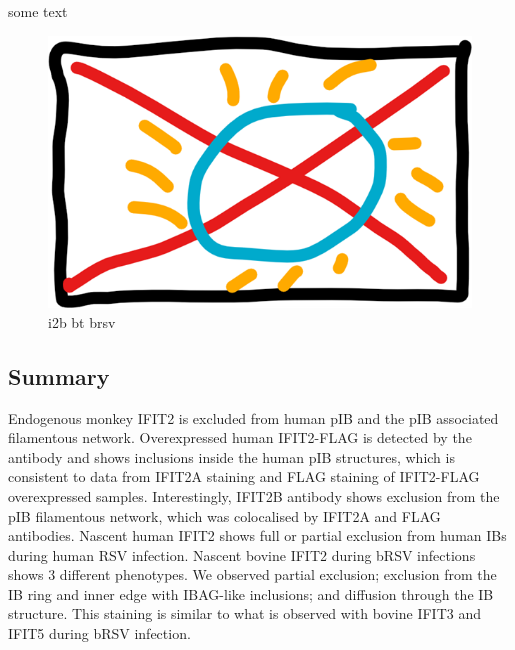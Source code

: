 some text

\begin{figure}
    \centering
    \includegraphics[width=0.5\linewidth]{09. Chapter 4//Figs//02. I2B/00. placeholder.png}
    \caption[i2b bt brsv]{i2b bt brsv}
    \label{i2b bt brsv}
\end{figure}

\subsection{Summary} \label{Summary}
Endogenous monkey IFIT2 is excluded from human pIB and the pIB associated filamentous network. Overexpressed human IFIT2-FLAG is detected by the antibody and shows inclusions inside the human pIB structures, which is consistent to data from IFIT2A staining and FLAG staining of IFIT2-FLAG overexpressed samples. Interestingly, IFIT2B antibody shows exclusion from the pIB filamentous network, which was colocalised by IFIT2A and FLAG antibodies. Nascent human IFIT2 shows full or partial exclusion from human IBs during human RSV infection. Nascent bovine IFIT2 during bRSV infections shows 3 different phenotypes. We observed partial exclusion; exclusion from the IB ring and inner edge with IBAG-like inclusions; and diffusion through the IB structure. This staining is similar to what is observed with bovine IFIT3 and IFIT5 during bRSV infection.